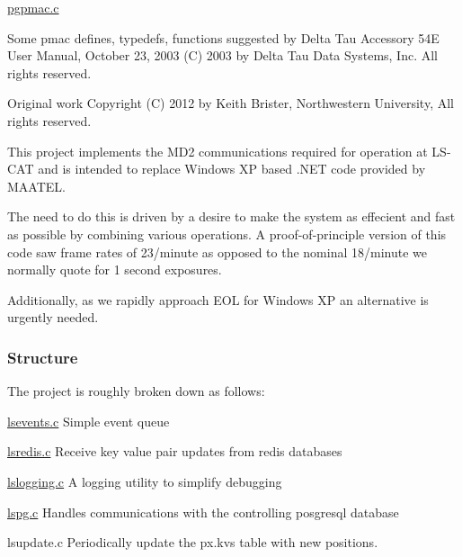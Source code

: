 \hyperlink{pgpmac_8c}{pgpmac.\-c}

Some pmac defines, typedefs, functions suggested by Delta Tau Accessory 54\-E User Manual, October 23, 2003 (C) 2003 by Delta Tau Data Systems, Inc. All rights reserved.

Original work Copyright (C) 2012 by Keith Brister, Northwestern University, All rights reserved.

This project implements the M\-D2 communications required for operation at L\-S-\/\-C\-A\-T and is intended to replace Windows X\-P based .N\-E\-T code provided by M\-A\-A\-T\-E\-L.

The need to do this is driven by a desire to make the system as effecient and fast as possible by combining various operations. A proof-\/of-\/principle version of this code saw frame rates of 23/minute as opposed to the nominal 18/minute we normally quote for 1 second exposures.

Additionally, as we rapidly approach E\-O\-L for Windows X\-P an alternative is urgently needed.

\subsubsection*{Structure}

The project is roughly broken down as follows\-: 
\begin{DoxyPre}
    \hyperlink{lsevents_8c}{lsevents.c}          Simple event queue\end{DoxyPre}



\begin{DoxyPre}    \hyperlink{lsredis_8c}{lsredis.c}           Receive key value pair updates from redis databases\end{DoxyPre}



\begin{DoxyPre}    \hyperlink{lslogging_8c}{lslogging.c}         A logging utility to simplify debugging\end{DoxyPre}



\begin{DoxyPre}    \hyperlink{lspg_8c}{lspg.c}              Handles communications with the controlling posgresql database\end{DoxyPre}



\begin{DoxyPre}    lsupdate.c          Periodically update the px.kvs table with new positions.\end{DoxyPre}



